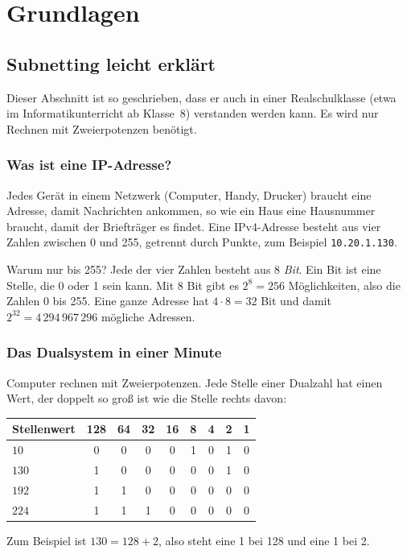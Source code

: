 \documentclass[a4paper,12pt]{article}
\theoremstyle{definition}
\begin{document}
\section{Grundlagen}

\subsection{Subnetting leicht erklärt}
\label{sec:leicht}

Dieser Abschnitt ist so geschrieben, dass er auch in einer Realschulklasse (etwa im Informatikunterricht ab Klasse~8) verstanden werden kann. Es wird nur Rechnen mit Zweierpotenzen benötigt.

\subsubsection{Was ist eine IP-Adresse?}

Jedes Gerät in einem Netzwerk (Computer, Handy, Drucker) braucht eine Adresse, damit Nachrichten ankommen, so wie ein Haus eine Hausnummer braucht, damit der Briefträger es findet. Eine IPv4-Adresse besteht aus vier Zahlen zwischen 0 und 255, getrennt durch Punkte, zum Beispiel \texttt{10.20.1.130}.

Warum nur bis 255? Jede der vier Zahlen besteht aus 8 \emph{Bit}. Ein Bit ist eine Stelle, die 0 oder 1 sein kann. Mit 8 Bit gibt es $2^8 = 256$ Möglichkeiten, also die Zahlen 0 bis 255. Eine ganze Adresse hat $4\cdot 8 = 32$ Bit und damit $2^{32} = 4\,294\,967\,296$ mögliche Adressen.

\subsubsection{Das Dualsystem in einer Minute}

Computer rechnen mit Zweierpotenzen. Jede Stelle einer Dualzahl hat einen Wert, der doppelt so groß ist wie die Stelle rechts davon:
\begin{center}
\begin{tabular}{lcccccccc}
\toprule
Stellenwert & 128 & 64 & 32 & 16 & 8 & 4 & 2 & 1 \\
\midrule
$10$ & 0 & 0 & 0 & 0 & 1 & 0 & 1 & 0 \\
$130$ & 1 & 0 & 0 & 0 & 0 & 0 & 1 & 0 \\
$192$ & 1 & 1 & 0 & 0 & 0 & 0 & 0 & 0 \\
$224$ & 1 & 1 & 1 & 0 & 0 & 0 & 0 & 0 \\
\bottomrule
\end{tabular}
\end{center}
Zum Beispiel ist $130 = 128 + 2$, also steht eine 1 bei 128 und eine 1 bei 2.
\end{document}
